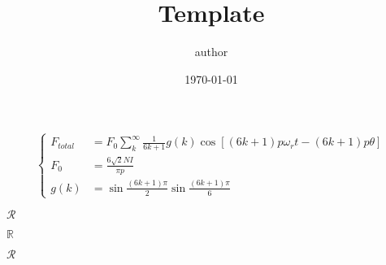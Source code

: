 \documentclass[UTF-8]{MyTemplate}
\begin{document}
\title{Template}
\author{author}
\date{\today}
\maketitle
% 


\begin{equation}
	\left\{
		\begin{aligned}
			\label{eq:demo}
			F_{total} &= F_0 \sum_{k}^{\infty} \frac{1}{6k+1} g(k) \cos[(6k+1)p\omega_r t -(6k+1)p\theta]\\
			F_0 &= \frac{6 \sqrt{2} N I}{\pi p}\\
			g(k) &= \sin \frac{(6k+1)\pi}{2} \sin \frac{(6k+1)\pi}{6}
		\end{aligned}
	\right.
\end{equation}

$\mathcal{R}$

$\mathbb{R}$

$\mathscr{R}$

\newpage

\end{document}

